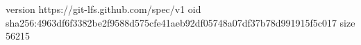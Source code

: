 version https://git-lfs.github.com/spec/v1
oid sha256:4963df6f3382be2f9588d575cfe41aeb92df05748a07df37b78d991915f5c017
size 56215
